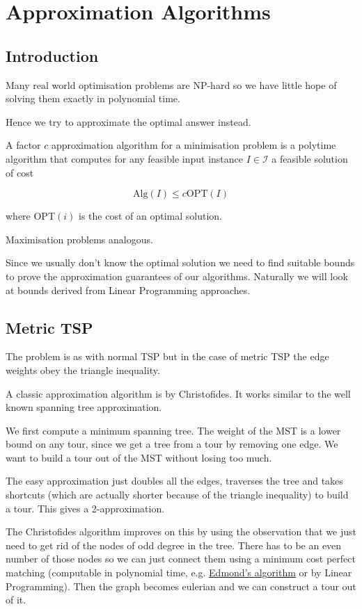 \chapter{Approximation Algorithms}
\section{Introduction}

Many real world optimisation problems are NP-hard so we have little hope of solving them exactly in polynomial time.

Hence we try to approximate the optimal answer instead.

\begin{Def} A factor $c$ approximation algorithm for a minimisation problem is a polytime algorithm that computes for any feasible input instance $I\in \mathcal{I}$ a feasible solution of cost

\[\text{Alg}(I) \leq c \text{OPT}(I)\]

where OPT$(i)$ is the cost of an optimal solution.

Maximisation problems analogous.
\end{Def}

Since we usually don't know the optimal solution we need to find suitable bounds to prove the approximation guarantees of our algorithms. Naturally we will look at bounds derived from Linear Programming approaches.

\section{Metric TSP}

The problem is as with normal TSP but in the case of metric TSP the edge weights obey the triangle inequality.

A classic approximation algorithm is by Christofides. It works similar to the well known spanning tree approximation. 

We first compute a minimum spanning tree. The weight of the MST is a lower bound on any tour, since we get a tree from a tour by removing one edge. We want to build a tour out of the MST without losing too much.

The easy approximation just doubles all the edges, traverses the tree and takes shortcuts (which are actually shorter because of the triangle inequality) to build a tour. This gives a 2-approximation.

The Christofides algorithm improves on this by using the observation that we just need to get rid of the nodes of odd degree in the tree. There has to be an even number of those nodes so we can just connect them using a minimum cost perfect matching (computable in polynomial time, e.g. \href{https://secure.wikimedia.org/wikipedia/en/wiki/Edmonds\%27s\_matching\_algorithm}{Edmond's algorithm} or by Linear Programming). Then the graph becomes eulerian and we can construct a tour out of it.

